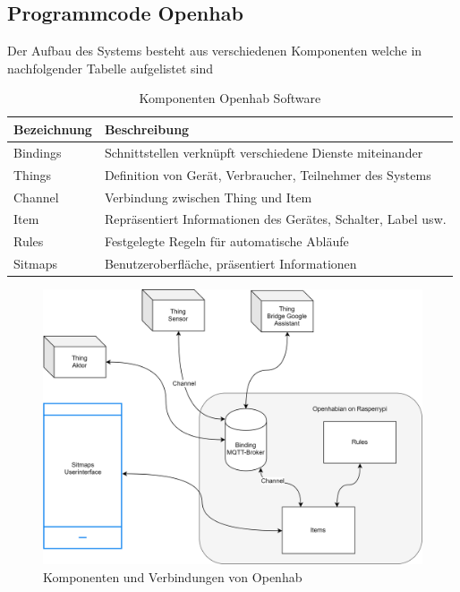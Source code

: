 \subsection{Programmcode Openhab}        
Der Aufbau des Systems besteht aus verschiedenen Komponenten welche in nachfolgender Tabelle aufgelistet sind
\begin{table}[H]
	\begin{tabular}{|l|l|}
		\hline 
		Bezeichnung	& Beschreibung \\ 
		\hline 
		Bindings	& Schnittstellen verknüpft verschiedene Dienste miteinander  \\ 
		\hline 
		Things	& Definition von Gerät, Verbraucher, Teilnehmer des Systems  \\ 
		\hline 
		Channel	& Verbindung zwischen Thing und Item  \\ 
		\hline 
		Item	& Repräsentiert Informationen des Gerätes, Schalter, Label usw. \\ 
		\hline 
		Rules	& Festgelegte Regeln für automatische Abläufe\\ 
		\hline 
		Sitmaps	& Benutzeroberfläche, präsentiert Informationen  \\ 
		\hline 
	\end{tabular} 
	\caption{Komponenten Openhab Software \cite{noauthor_introduction_nodate-1}}
	\label{tab: Komponenten Openhab Software}
\end{table}
\begin{figure}[H]
	\centering
	\includegraphics[width=\textwidth]{graphics/Openhabian.png}
	\caption{Komponenten und Verbindungen von Openhab}
	\label{pic: Komponenten Openhab}
\end{figure}   

